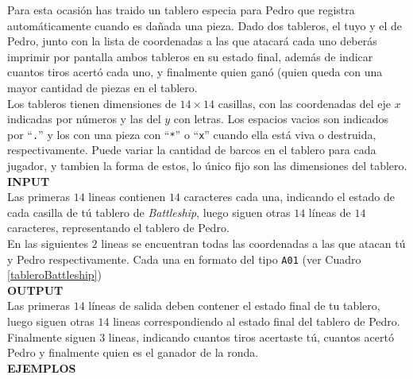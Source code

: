 Para esta ocasión has traido un tablero especia para Pedro que registra automáticamente cuando es dañada una pieza. Dado dos tableros, el tuyo y el de Pedro, junto con la lista de coordenadas a las que atacará cada uno deberás imprimir por pantalla ambos tableros en su estado final, además de indicar cuantos tiros acertó cada uno, y finalmente quien ganó (quien queda con una mayor cantidad de piezas en el tablero. \\
Los tableros tienen dimensiones de $14\times14$ casillas, con las coordenadas del eje $x$ indicadas por números y las del $y$ con letras. Los espacios vacios son indicados por ``\texttt{.}'' y los con una pieza con ``\texttt{*}'' o ``\texttt{x}'' cuando ella está viva o destruida, respectivamente.
Puede variar la cantidad de barcos en el tablero para cada jugador, y tambien la forma de estos, lo único fijo son las dimensiones del tablero.\\

\textbf{INPUT}\\
Las primeras $14$ lineas contienen $14$ caracteres cada una, indicando el estado de cada casilla de tú tablero de \textit{Battleship}, luego siguen otras $14$ líneas de $14$ caracteres, representando el tablero de Pedro.\\
En las siguientes $2$ lineas se encuentran todas las coordenadas a las que atacan tú y Pedro respectivamente. Cada una en formato del tipo \texttt{A01} (ver Cuadro \ref{tableroBattleship})\\

\textbf{OUTPUT}\\
Las primeras $14$ líneas de salida deben contener el estado final de tu tablero, luego siguen otras $14$ lineas correspondiendo al estado final del tablero de Pedro. Finalmente siguen $3$ lineas, indicando cuantos tiros acertaste tú, cuantos acertó Pedro y finalmente quien es el ganador de la ronda.\\

\textbf{EJEMPLOS}\\

